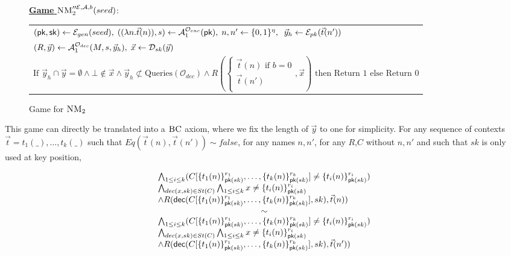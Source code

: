 \begin{figure}[h!]
  \vspace{-1em}
  \centering

        \underline{\textbf{Game}
        $\textsc{NM}_2''^{\mathcal{E},\mathcal{A},b}(seed)$}: \\
        \begin{tabular}{l}
          $(\textsf{pk},\textsf{sk}) \leftarrow \mathcal{E}_{gen}(seed),\; ((\lambda n. \vec{t}(n)),s) \leftarrow \mathcal{A}_1^{\mathcal{O}_{enc}}(\textsf{pk}),\; n,n'\leftarrow \{0,1\}^\eta,\;
  \; \vec{y}_h \leftarrow \mathcal{E}_{pk}(\vec{t}(n'))$\\
          $(R,\vec{y}) \leftarrow \mathcal{A}_1^{\mathcal{O}_{dec}}(M,s,\vec{y}_h),\; \vec{x} \leftarrow \mathcal{D}_{sk}(\vec{y})$ \\
          $\text{If } \vec{y}_h \cap \vec{y} = \emptyset \wedge \bot \notin \vec{x} \wedge \vec{y}_h \not \subset \text{Queries}(\mathcal{O}_{dec}) \wedge R( \begin{cases} \vec{t}(n) \text{ if } b=0 \\  \vec{t}(n')\\ \end{cases},\vec{x}) \text{ then Return } 1 \text{ else Return } 0$
        \end{tabular}
  \caption{Game for $\textsc{NM}_2$}
  \label{fig:nmfinal}
\end{figure}

This game can directly be translated into a $\textsc{BC}$ axiom, where we fix the length of $\vec{y}$ to one for simplicity. For any sequence of contexts $\vec{t}=t_1(\_),\ldots,t_k(\_)$ such that $ Eq(\vec{t}(n),\vec{t}(n')) \sim false$, for any names $n, n'$, for any $R$,$C$ without $n,n'$ and such that $sk$ is only used at key position,

\[
  \begin{array}{l}


 \bigwedge_{1 \leq i \leq k}( C[\myenc{t_1(n)}{r_1}{sk},\ldots,\myenc{t_k(n)}{r_k}{sk}] \not = \myenc{t_i(n)}{r_i}{sk} )      \\
 \bigwedge_{ dec(x,sk) \in St(C) }  \bigwedge_{1 \leq i \leq k} x \not = \myenc{t_i(n)}{r_i}{sk} \\
\wedge R( \mydec(C[\myenc{t_1(n)}{r_1}{sk},\ldots,\myenc{t_k(n)}{r_k}{sk}],sk),\vec{t}(n)) \\
\multicolumn{1}{c}{\sim}\\

 \bigwedge_{1 \leq i \leq k}( C[\myenc{t_1(n)}{r_1}{sk},\ldots,\myenc{t_k(n)}{r_k}{sk}] \not = \myenc{t_i(n)}{r_i}{sk} )      \\
 \bigwedge_{ dec(x,sk) \in St(C) }  \bigwedge_{1 \leq i \leq k} x \not = \myenc{t_i(n)}{r_i}{sk} \\
\wedge R( \mydec(C[\myenc{t_1(n)}{r_1}{sk},\ldots,\myenc{t_k(n)}{r_k}{sk}],sk),\vec{t}(n')) \\
  \end{array}

  \]

